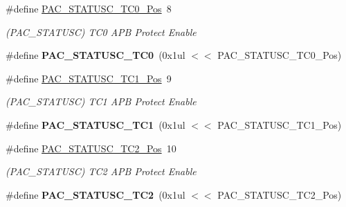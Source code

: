 \begin{DoxyCompactItemize}
\item 
\hypertarget{group___s_a_m_l21___p_a_c_ga95e36c4a9af2cd87cb751fe42c8f4b64}{}\#define \hyperlink{group___s_a_m_l21___p_a_c_ga95e36c4a9af2cd87cb751fe42c8f4b64}{P\+A\+C\+\_\+\+S\+T\+A\+T\+U\+S\+C\+\_\+\+T\+C0\+\_\+\+Pos}~8\label{group___s_a_m_l21___p_a_c_ga95e36c4a9af2cd87cb751fe42c8f4b64}

\begin{DoxyCompactList}\small\item\em (P\+A\+C\+\_\+\+S\+T\+A\+T\+U\+S\+C) T\+C0 A\+P\+B Protect Enable \end{DoxyCompactList}\item 
\hypertarget{group___s_a_m_l21___p_a_c_ga00f78b26cbd401d6f7ac094deaefd106}{}\#define {\bfseries P\+A\+C\+\_\+\+S\+T\+A\+T\+U\+S\+C\+\_\+\+T\+C0}~(0x1ul $<$$<$ P\+A\+C\+\_\+\+S\+T\+A\+T\+U\+S\+C\+\_\+\+T\+C0\+\_\+\+Pos)\label{group___s_a_m_l21___p_a_c_ga00f78b26cbd401d6f7ac094deaefd106}

\item 
\hypertarget{group___s_a_m_l21___p_a_c_ga6cd9820d792e750a7b1285affe5f5437}{}\#define \hyperlink{group___s_a_m_l21___p_a_c_ga6cd9820d792e750a7b1285affe5f5437}{P\+A\+C\+\_\+\+S\+T\+A\+T\+U\+S\+C\+\_\+\+T\+C1\+\_\+\+Pos}~9\label{group___s_a_m_l21___p_a_c_ga6cd9820d792e750a7b1285affe5f5437}

\begin{DoxyCompactList}\small\item\em (P\+A\+C\+\_\+\+S\+T\+A\+T\+U\+S\+C) T\+C1 A\+P\+B Protect Enable \end{DoxyCompactList}\item 
\hypertarget{group___s_a_m_l21___p_a_c_ga217aee3405e068a1150fd35172ebd954}{}\#define {\bfseries P\+A\+C\+\_\+\+S\+T\+A\+T\+U\+S\+C\+\_\+\+T\+C1}~(0x1ul $<$$<$ P\+A\+C\+\_\+\+S\+T\+A\+T\+U\+S\+C\+\_\+\+T\+C1\+\_\+\+Pos)\label{group___s_a_m_l21___p_a_c_ga217aee3405e068a1150fd35172ebd954}

\item 
\hypertarget{group___s_a_m_l21___p_a_c_gae64de236bcd55d2a45ca8307d7dd620f}{}\#define \hyperlink{group___s_a_m_l21___p_a_c_gae64de236bcd55d2a45ca8307d7dd620f}{P\+A\+C\+\_\+\+S\+T\+A\+T\+U\+S\+C\+\_\+\+T\+C2\+\_\+\+Pos}~10\label{group___s_a_m_l21___p_a_c_gae64de236bcd55d2a45ca8307d7dd620f}

\begin{DoxyCompactList}\small\item\em (P\+A\+C\+\_\+\+S\+T\+A\+T\+U\+S\+C) T\+C2 A\+P\+B Protect Enable \end{DoxyCompactList}\item 
\hypertarget{group___s_a_m_l21___p_a_c_gac4998749f89932f7b5d6b9a4543d7c11}{}\#define {\bfseries P\+A\+C\+\_\+\+S\+T\+A\+T\+U\+S\+C\+\_\+\+T\+C2}~(0x1ul $<$$<$ P\+A\+C\+\_\+\+S\+T\+A\+T\+U\+S\+C\+\_\+\+T\+C2\+\_\+\+Pos)\label{group___s_a_m_l21___p_a_c_gac4998749f89932f7b5d6b9a4543d7c11}


\end{DoxyCompactItemize}

